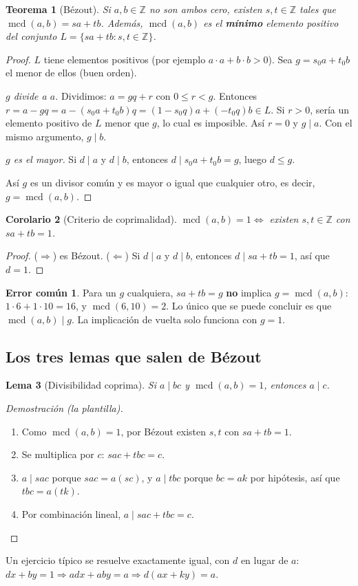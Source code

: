 \documentclass[11pt,a4paper]{article}
\newtheorem{teorema}{Teorema}[section]
\newtheorem{lema}[teorema]{Lema}
\newtheorem{corolario}[teorema]{Corolario}
\theoremstyle{definition}
\newcommand{\Z}{\mathbb{Z}}
\newcommand{\mcd}{\operatorname{mcd}}
\theoremstyle{notait}
\theoremstyle{nota}
\newtheorem*{trampaX}{Error común}
\newenvironment{trampa}{\begin{trampaX}\leavevmode\marginpar{\raggedleft\vspace*{-0.9\baselineskip}\dbend}\ignorespaces}{\end{trampaX}}
\begin{document}
\begin{teorema}[Bézout]
Si $a,b\in\Z$ no son ambos cero, existen $s,t\in\Z$ tales que $\mcd(a,b)=sa+tb$. Además, $\mcd(a,b)$ es el \textbf{mínimo} elemento positivo del conjunto $L=\{sa+tb: s,t\in\Z\}$.
\end{teorema}

\begin{proof}
$L$ tiene elementos positivos (por ejemplo $a\cdot a+b\cdot b>0$). Sea $g=s_0a+t_0b$ el menor de ellos (buen orden).

\emph{$g$ divide a $a$.} Dividimos: $a=gq+r$ con $0\le r<g$. Entonces $r=a-gq=a-(s_0a+t_0b)q=(1-s_0q)a+(-t_0q)b\in L$. Si $r>0$, sería un elemento positivo de $L$ menor que $g$, lo cual es imposible. Así $r=0$ y $g\mid a$. Con el mismo argumento, $g\mid b$.

\emph{$g$ es el mayor.} Si $d\mid a$ y $d\mid b$, entonces $d\mid s_0a+t_0b=g$, luego $d\le g$.

Así $g$ es un divisor común y es mayor o igual que cualquier otro, es decir, $g=\mcd(a,b)$.
\end{proof}

\begin{corolario}[Criterio de coprimalidad]
$\mcd(a,b)=1\iff$ existen $s,t\in\Z$ con $sa+tb=1$.
\end{corolario}
\begin{proof}
($\Rightarrow$) es Bézout. ($\Leftarrow$) Si $d\mid a$ y $d\mid b$, entonces $d\mid sa+tb=1$, así que $d=1$.
\end{proof}

\begin{trampa}
Para un $g$ cualquiera, $sa+tb=g$ \textbf{no} implica $g=\mcd(a,b)$: $1\cdot 6+1\cdot 10=16$, y $\mcd(6,10)=2$. Lo único que se puede concluir es que $\mcd(a,b)\mid g$. La implicación de vuelta solo funciona con $g=1$.
\end{trampa}

\subsection{Los tres lemas que salen de Bézout}

\begin{lema}[Divisibilidad coprima]\label{lem:coprima}
Si $a\mid bc$ y $\mcd(a,b)=1$, entonces $a\mid c$.
\end{lema}
\begin{proof}[Demostración (la plantilla)]
\begin{enumerate}
\item Como $\mcd(a,b)=1$, por Bézout existen $s,t$ con $sa+tb=1$.
\item Se multiplica por $c$: $sac+tbc=c$.
\item $a\mid sac$ porque $sac=a(sc)$, y $a\mid tbc$ porque $bc=ak$ por hipótesis, así que $tbc=a(tk)$.
\item Por combinación lineal, $a\mid sac+tbc=c$.\qedhere
\end{enumerate}
\end{proof}
Un ejercicio típico se resuelve exactamente igual, con $d$ en lugar de $a$: $dx+by=1\Rightarrow adx+aby=a\Rightarrow d(ax+ky)=a$.
\end{document}
